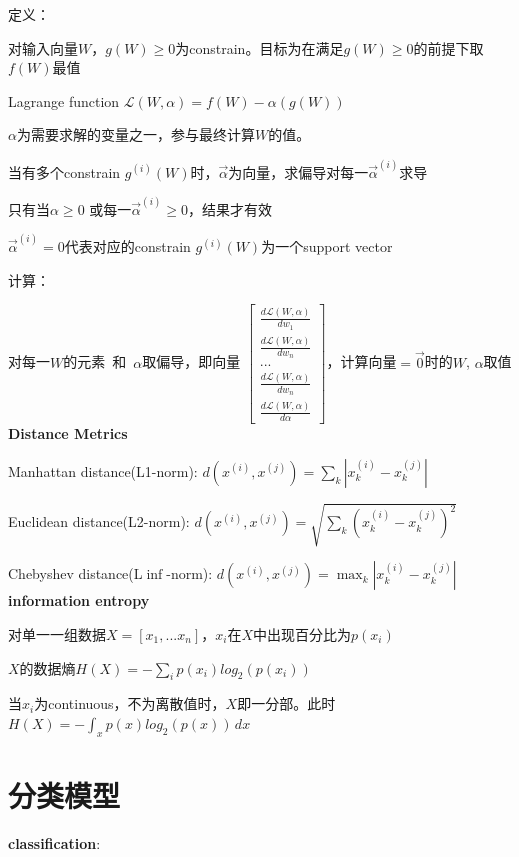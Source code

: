 \documentclass[UTF8]{ctexart}
\begin{document}
  定义：

  \quad 对输入向量$W$，$g(W) \geq 0$为constrain。目标为在满足$g(W) \geq 0$的前提下取$f(W)$最值

  \quad Lagrange function $\mathcal{L} (W, \alpha) = f(W) - \alpha(g(W))$

  \quad \quad $\alpha$为需要求解的变量之一，参与最终计算$W$的值。

  \quad \quad 当有多个constrain $g^{(i)}(W)$时，$\vec{\alpha}$为向量，求偏导对每一$\vec{\alpha}^{(i)}$求导

  \quad \quad 只有当$\alpha \geq 0$ 或每一$\vec{\alpha}^{(i)} \geq 0$，结果才有效

  \quad \quad $\vec{\alpha}^{(i)} = 0$代表对应的constrain $g^{(i)}(W)$为一个support vector

  计算：
  
  \quad 对每一$W$的元素\ 和\ $\alpha$取偏导，即向量
  $\begin{bmatrix}
    \frac{d \mathcal{L}(W, \alpha)}{d w_1}  \\
    \frac{d \mathcal{L}(W, \alpha)}{d w_n} \\
    ... \\
    \frac{d \mathcal{L}(W, \alpha)}{d w_n} \\
    \frac{d \mathcal{L}(W, \alpha)}{d \alpha}
  \end{bmatrix}$，计算向量$=\vec{0} $时的$W$, $\alpha$取值\\
\textbf{Distance Metrics}

  Manhattan distance(L1-norm): $d(x^{(i)}, x^{(j)}) = \sum_k |x^{(i)}_k - x^{(j)}_k|$

  Euclidean distance(L2-norm): $d(x^{(i)}, x^{(j)}) = \sqrt{\sum_k (x^{(i)}_k - x^{(j)}_k) ^ 2}$

  Chebyshev distance(L$\inf$-norm): $d(x^{(i)}, x^{(j)}) = \max_k |x^{(i)}_k - x^{(j)}_k|$\\
\textbf{information entropy}

  对单一一组数据$X = [x_1, ... x_n]$，$x_i$在$X$中出现百分比为$p(x_i)$
  
  $X$的数据熵$H(X) = -\sum_i p(x_i)log_2(p(x_i))$

  当$x_i$为continuous，不为离散值时，$X$即一分部。此时$H(X) = -\int_{x} p(x)log_2(p(x))\,dx $
\section{分类模型}
\noindent \textbf{classification}:
\end{document}
